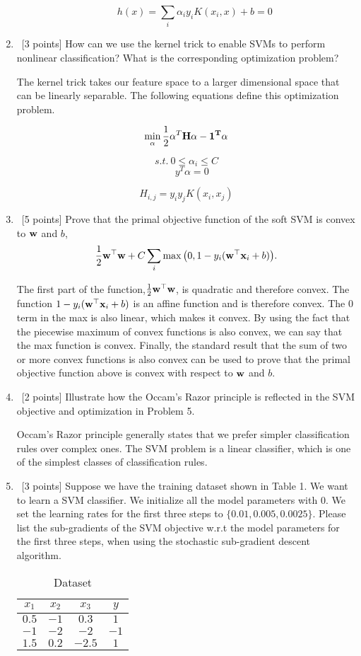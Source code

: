 \documentclass[12pt, fullpage,letterpaper]{article}
\begin{document}
\begin{enumerate}
\begin{enumerate}
		$$ h(x) = \sum_i \alpha_i y_i K(x_i, x) + b = 0 $$ 
	\end{enumerate}
	
	
	\item~[3 points] How can we use the kernel trick to enable SVMs to perform nonlinear classification? What is the corresponding optimization problem?
	
	The kernel trick takes our feature space to a larger dimensional space that can be linearly separable. The following equations define this optimization problem.
	
		$$ \min_{\alpha} \frac{1}{2} \alpha^T \bf H \alpha -  1^T \alpha $$

	$$s.t. \ 0 \le \alpha_i \le C $$
	$$ \ \ \ \ \ y^T \alpha = 0 $$
	
	$$H_{i,j} = y_i y_j K(x_i,x_j)$$


	\item~[5 points] Prove that the primal objective function of the soft SVM is convex to ${\bf w}$ and $b$, 
	\[
	\frac{1}{2}{\bf w}^\top{\bf w} + C\sum_{i} \max\big(0, 1 - y_i({\bf w}^\top{\bf x}_i+b)\big).
	\]
	
	The first part of the function,$\frac{1}{2}{\bf w}^\top{\bf w}$, is quadratic and therefore convex. The function $1 - y_i({\bf w}^\top{\bf x}_i+b)$ is an affine function and is therefore convex. The $0$ term in the max is also linear, which makes it convex. By using the fact that the piecewise maximum of convex functions is also convex, we can say that the max function is convex. Finally, the standard result that the sum of two or more convex functions is also convex can be used to prove that the primal objective function above is convex with respect to ${\bf w}$ and $b$.
	
	
	\item~[2 points] Illustrate how the Occam's Razor principle is reflected in the SVM objective and optimization in Problem 5. 
	
	Occam's Razor principle generally states that we prefer simpler classification rules over complex ones. The SVM problem is a linear classifier, which is one of the simplest classes of classification rules.  
	
	
	\item~[3 points] Suppose we have the training dataset shown in Table 1. We want to learn a SVM classifier. We initialize all the model parameters with $0$. We set the learning rates for the first three steps to $\{0.01, 0.005, 0.0025\}$.  Please list the sub-gradients of the SVM objective w.r.t the model parameters for the first three steps, when using the stochastic sub-gradient descent algorithm. 
	\begin{table}[h]
		\centering
		\begin{tabular}{ccc|c}
			$x_1$ & $x_2$ & $x_3$ &  $y$\\ 
			\hline\hline
			$0.5$ & $-1$ & $0.3$ & $1$ \\ \hline
			$-1$ & $-2$ & $-2$ & $-1$\\ \hline
			$1.5$ & $0.2$ & $-2.5$ & $1$\\ \hline
		\end{tabular}
	\caption{Dataset}
	\end{table}
	

\end{enumerate}
\end{document}
